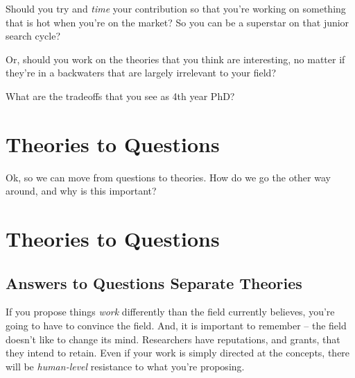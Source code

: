 \documentclass[
  letterpaper,
  DIV=11,
  numbers=noendperiod]{scrreprt}
\begin{document}
\begin{tcolorbox}[enhanced jigsaw, bottomtitle=1mm, coltitle=black, colback=white, colframe=quarto-callout-note-color-frame, title=\textcolor{quarto-callout-note-color}{\faInfo}\hspace{0.5em}{Open Discussion}, opacityback=0, arc=.35mm, titlerule=0mm, leftrule=.75mm, toptitle=1mm, rightrule=.15mm, opacitybacktitle=0.6, colbacktitle=quarto-callout-note-color!10!white, toprule=.15mm, left=2mm, bottomrule=.15mm, breakable]

Should you try and \emph{time} your contribution so that you're working
on something that is hot when you're on the market? So you can be a
superstar on that junior search cycle?

Or, should you work on the theories that you think are interesting, no
matter if they're in a backwaters that are largely irrelevant to your
field?

What are the tradeoffs that you see as 4th year PhD?

\end{tcolorbox}


\chapter{Theories to Questions}\label{theories-to-questions}

Ok, so we can move from questions to theories. How do we go the other
way around, and why is this important?


\chapter{Theories to Questions}\label{theories-to-questions-1}

\section{Answers to Questions Separate
Theories}\label{answers-to-questions-separate-theories}

If you propose things \emph{work} differently than the field currently
believes, you're going to have to convince the field. And, it is
important to remember -- the field doesn't like to change its mind.
Researchers have reputations, and grants, that they intend to retain.
Even if your work is simply directed at the concepts, there will be
\emph{human-level} resistance to what you're proposing.
\end{document}
